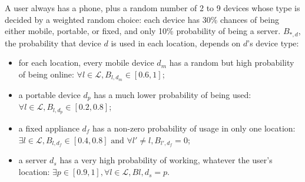 A user always has a phone, plus a random number of 2 to 9 devices whose type is decided by a weighted random choice: each device has 30\% chances of being either mobile, portable, or fixed, and only 10\% probability of being a server.
$B_{*, d}$, the probability that device $d$ is used in each location, depends on $d$'s device type: 
\begin{itemize}
	\item for each location, every mobile device $d_m$ has a random but high probability of being online: $\forall l \in \mathcal{L}, B_{l, d_m} \in [0.6, 1]$;
	\item a portable device $d_p$ has a much lower probability of being used: $\forall l \in \mathcal{L}, B_{l, d_p} \in [0.2, 0.8]$; 
	\item a fixed appliance $d_f$ has a non-zero probability of usage in only one location: $\exists l \in \mathcal{L}, B_{l, d_f} \in [0.4, 0.8] \text{ and } \forall l' \neq l, B_{l', d_f} = 0$;
	\item a server $d_s$ has a very high probability of working, whatever the user's location: $\exists p \in [0.9, 1], \forall l \in \mathcal{L}, B{l, d_s} = p$.
\end{itemize} 

